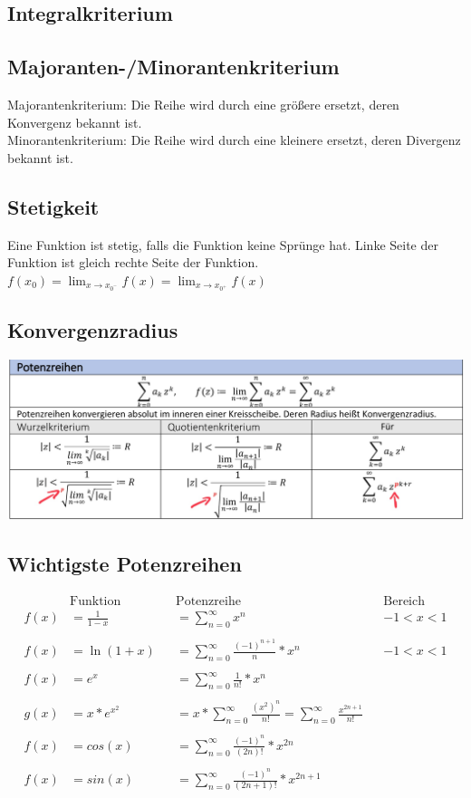 \documentclass[12pt,a4paper]{article}
\begin{document}
	\subsection{Integralkriterium}
		

	\subsection{Majoranten-/Minorantenkriterium}
		Majorantenkriterium: Die Reihe wird durch eine größere ersetzt, deren Konvergenz bekannt ist.\\
		Minorantenkriterium: Die Reihe wird durch eine kleinere ersetzt, deren Divergenz bekannt ist.

	\subsection{Stetigkeit}
		Eine Funktion ist stetig, falls die Funktion keine Sprünge hat. 
		Linke Seite der Funktion ist gleich rechte Seite der Funktion.\\
		$f(x_0) = \lim_{x \to x_{0^-}} f(x) = \lim_{x \to x_{0^+}} f(x) $ \\
	
	\subsection{Konvergenzradius}
		\includegraphics[scale=0.3]{Bilder/Konvergenzradius.jpg}

	\subsection{Wichtigste Potenzreihen}
		$$
		\begin{aligned}
		&\text{Funktion }&& \text{Potenzreihe }&& \text{Bereich} \\
		f(x)&= \frac{1}{1-x}&& =\sum^{\infty}_{n=0}x^{n} && -1 <x <1\\\\
		f(x)&= \ln{(1+x)}&&=\sum^{\infty}_{n=0} \frac{(-1)^{n+1}}{n}*x^{n} && -1 <x <1\\\\
		f(x)&=e^{x} &&= \sum^{\infty}_{n=0}{\frac{1}{n!}}*x^{n}\\\\
		g(x)&=x*e^{x^{2}}&&=x*\sum^{\infty}_{n=0} \frac{{(x^{2})^{n}}}{n!} = \sum^{\infty}_{n=0} \frac{x^{2n+1}}{n!}\\\\
		f(x)&=cos(x) &&= \sum^{\infty}_{n=0}{ \frac{(-1)^{n}}{(2n)!}*x^{2n}}\\\\
		f(x)&=sin(x) &&= \sum^{\infty}_{n=0}{ \frac{(-1)^{n}}{(2n+1)!}*x^{2n+1}}
		\end{aligned}
		$$
\end{document}
